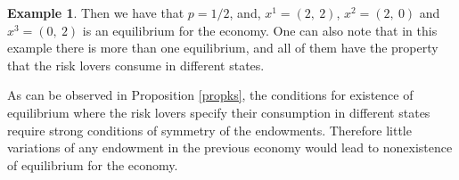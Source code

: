 \documentclass[pdftex]{article}
\numberwithin{equation}{section}
\theoremstyle{th}
\newtheorem{proof lemma}{{Proof Lemma}.}
\theoremstyle{definition}
\newtheorem{example}{Example}%
\newtheorem*{risk lovers}{Risk lovers}
\newtheorem*{risk averse}{Risk averse}
\begin{document}
{\begin{example}
Then we have that $p=1/2$, and, $x^1=(2,\ 2)$, $x^2=(2,\ 0)$ and $x^3=(0,\ 2)$ is an equilibrium for the economy. One can also note that in this example there is more than one equilibrium, and all of them have the property that the risk lovers consume in different states.

\end{example}

As can be observed in Proposition \ref{propks}, the conditions for existence of equilibrium where the risk lovers specify their consumption in different states require strong conditions of symmetry of the endowments. Therefore little variations of any endowment in the previous economy would lead to nonexistence of equilibrium for the economy.

%
%
%
%
%
%
%
}
\end{document}
